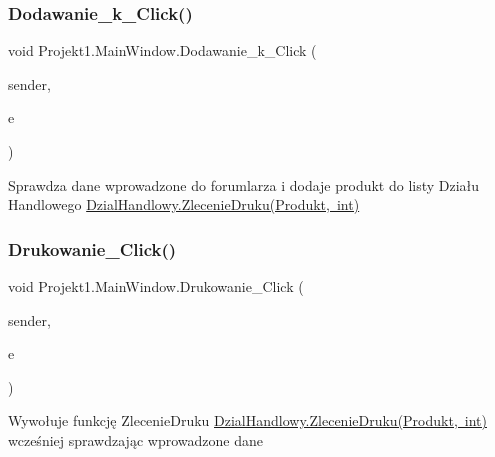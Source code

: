 \subsubsection{\texorpdfstring{Dodawanie\_k\_Click()}{Dodawanie\_k\_Click()}}
{\footnotesize\ttfamily void Projekt1.\+Main\+Window.\+Dodawanie\+\_\+k\+\_\+\+Click (\begin{DoxyParamCaption}\item[{object}]{sender,  }\item[{Routed\+Event\+Args}]{e }\end{DoxyParamCaption})\hspace{0.3cm}{\ttfamily [private]}}



Sprawdza dane wprowadzone do forumlarza i dodaje produkt do listy Działu Handlowego \mbox{\hyperlink{class_projekt1_1_1_dzial_handlowy_a42c78f53cf41e75b39498a7da96e7bc3}{Dzial\+Handlowy.\+Zlecenie\+Druku(\+Produkt, int)}} 

\mbox{\label{class_projekt1_1_1_main_window_a263e416fd6908e2f47dc0b7fb64cc269}} 
\subsubsection{\texorpdfstring{Drukowanie\_Click()}{Drukowanie\_Click()}}
{\footnotesize\ttfamily void Projekt1.\+Main\+Window.\+Drukowanie\+\_\+\+Click (\begin{DoxyParamCaption}\item[{object}]{sender,  }\item[{Routed\+Event\+Args}]{e }\end{DoxyParamCaption})\hspace{0.3cm}{\ttfamily [private]}}



Wywołuje funkcję Zlecenie\+Druku \mbox{\hyperlink{class_projekt1_1_1_dzial_handlowy_a42c78f53cf41e75b39498a7da96e7bc3}{Dzial\+Handlowy.\+Zlecenie\+Druku(\+Produkt, int)}} wcześniej sprawdzając wprowadzone dane 

\mbox{\label{class_projekt1_1_1_main_window_afdda85a4d4f8eaa2014fdf0bc313af58}} 
